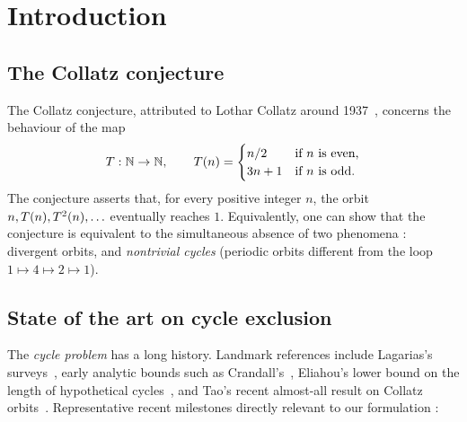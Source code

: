 
\section{Introduction}
\label{sec:introduction}

\subsection{The Collatz conjecture}

The Collatz conjecture, attributed to Lothar Collatz around
1937~\cite{Collatz1937}, concerns the behaviour of the map
\[
T : \mathbb{N} \to \mathbb{N}, \qquad
T(n) = \begin{cases} n / 2 & \text{if } n \text{ is even,}\\ 3n + 1 & \text{if } n \text{ is odd.}\end{cases}
\]
The conjecture asserts that, for every positive integer \(n\), the orbit
\(n, T(n), T^2(n), \ldots\) eventually reaches \(1\).
Equivalently, one can show that the conjecture is equivalent to the
simultaneous absence of two phenomena : divergent orbits, and
\emph{nontrivial cycles} (periodic orbits different from the loop
\(1 \mapsto 4 \mapsto 2 \mapsto 1\)).


\subsection{State of the art on cycle exclusion}

The \emph{cycle problem} has a long history. Landmark references include
Lagarias's surveys~\cite{Lagarias1985,Lagarias2010}, early analytic
bounds such as Crandall's~\cite{Crandall1978}, Eliahou's lower bound on
the length of hypothetical cycles~\cite{Eliahou1993}, and Tao's recent
almost-all result on Collatz orbits~\cite{Tao2022}. Representative
recent milestones directly relevant to our formulation :

